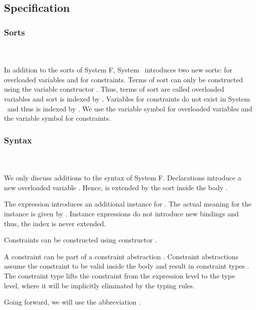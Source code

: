 \subsection{Specification}

\subsubsection{Sorts}\hfill\\\\
In addition to the sorts of System F, System \Fo\ introduces two new sorts:  for overloaded variables and  for constraints.
\FoSort
Terms of sort  can only be constructed using the variable constructor . Thus, terms of sort  are called overloaded variables and sort  is indexed by .
Variables for constraints do not exist in System \Fo\ and thus  is indexed by . 
We use the variable symbol  for overloaded variables and the variable symbol  for constraints. 

\subsubsection{Syntax}\hfill\\\\
We only discuss additions to the syntax of System F.
\FoTerm
Declarations   introduce a new overloaded variable . 
Hence,  is extended by the sort  inside the body . 

\noindent The expression   \Constr{=}    introduces an additional instance for . 
The actual meaning for the instance is given by .
Instance expressions do not introduce new bindings and thus, the index  is never extended.

\noindent Constraints  can be constructed using constructor  \Constr{:} . 

\noindent A constraint  can be part of a constraint abstraction \Constr{\lambdabar}   . Constraint abstractions assume the constraint  to be valid inside the body  and result in constraint types \Constr{[}  \Constr{]⇒} . The constraint type lifts the constraint from the expression level to the type level, where it will be implicitly eliminated by the typing rules.

\noindent Going forward, we will use the abbreviation \FoCstr.

